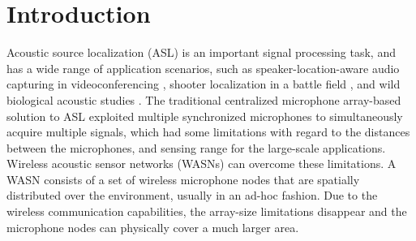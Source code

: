 \section{Introduction}

Acoustic source localization (ASL) is an important signal processing task, and has a wide range of application scenarios, such as speaker-location-aware audio capturing in videoconferencing \cite{guo2011localising}, shooter localization in a battle field \cite{sallai2011acoustic}, and wild biological acoustic studies \cite{allen2008voxnet}. 
The traditional centralized microphone array-based solution to ASL exploited multiple synchronized microphones to simultaneously acquire multiple signals, 
which had some limitations with regard to the distances between the microphones, and sensing range for the large-scale applications.
Wireless acoustic sensor networks (WASNs) can overcome these limitations. 
A WASN consists of a set of wireless microphone nodes that are spatially distributed over the environment, usually in an ad-hoc fashion. 
Due to the wireless communication capabilities, the array-size limitations disappear and the microphone nodes can physically cover a much larger area. 

